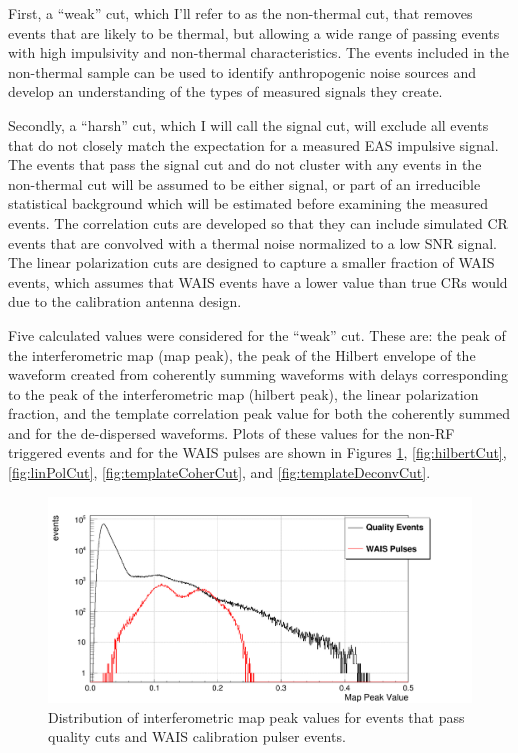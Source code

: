	First, a ``weak'' cut, which I'll refer to as the non-thermal cut, that removes events that are likely to be thermal, but allowing a wide range of passing events with high impulsivity and non-thermal characteristics.  The events included in the non-thermal sample can be used to identify anthropogenic noise sources and develop an understanding of the types of measured signals they create.  
	
	Secondly, a ``harsh'' cut, which I will call the signal cut, will exclude all events that do not closely match the expectation for a measured EAS impulsive signal.  The events that pass the signal cut and do not cluster with any events in the non-thermal cut will be assumed to be either signal, or part of an irreducible statistical background which will be estimated before examining the measured events.  The correlation cuts are developed so that they can include simulated CR events that are convolved with a thermal noise normalized to a low SNR signal.  The linear polarization cuts are designed to capture a smaller fraction of WAIS events, which assumes that WAIS events have a lower value than true CRs would due to the calibration antenna design.
	
	Five calculated values were considered for the ``weak'' cut.  These are: the peak of the interferometric map (map peak), the peak of the Hilbert envelope of the waveform created from coherently summing waveforms with delays corresponding to the peak of the interferometric map (hilbert peak), the linear polarization fraction, and the template correlation peak value for both the coherently summed and for the de-dispersed waveforms.  Plots of these values for the non-RF triggered events and for the WAIS pulses are shown in Figures \ref{fig:mapPeakCut}, \ref{fig:hilbertCut}, \ref{fig:linPolCut}, \ref{fig:templateCoherCut}, and \ref{fig:templateDeconvCut}.
	
	
\begin{figure}
	\centering
	\includegraphics[width=\textwidth]{figures/mapPeakCut}
	\caption{Distribution of interferometric map peak values for events that pass quality cuts and WAIS calibration pulser events.} 
	\label{fig:mapPeakCut}
\end{figure}
	
